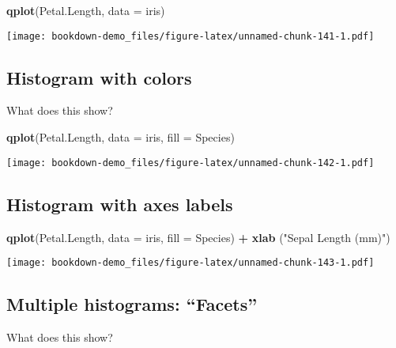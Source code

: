 \documentclass[]{book}
\newenvironment{Shaded}{\begin{snugshade}}{\end{snugshade}}
\newcommand{\KeywordTok}[1]{\textcolor[rgb]{0.13,0.29,0.53}{\textbf{#1}}}
\newcommand{\DataTypeTok}[1]{\textcolor[rgb]{0.13,0.29,0.53}{#1}}
\newcommand{\StringTok}[1]{\textcolor[rgb]{0.31,0.60,0.02}{#1}}
\newcommand{\OperatorTok}[1]{\textcolor[rgb]{0.81,0.36,0.00}{\textbf{#1}}}
\newcommand{\NormalTok}[1]{#1}
\theoremstyle{definition}
\theoremstyle{definition}
\theoremstyle{definition}
\theoremstyle{remark}
\begin{document}
\begin{Shaded}
\begin{Highlighting}[]
\KeywordTok{qplot}\NormalTok{(Petal.Length,}
      \DataTypeTok{data =}\NormalTok{ iris)}
\end{Highlighting}
\end{Shaded}

\texttt{[image: bookdown-demo\_files/figure-latex/unnamed-chunk-141-1.pdf]}

\subsection{Histogram with colors}\label{histogram-with-colors}

What does this show?

\begin{Shaded}
\begin{Highlighting}[]
\KeywordTok{qplot}\NormalTok{(Petal.Length,}
      \DataTypeTok{data =}\NormalTok{ iris,}
      \DataTypeTok{fill =}\NormalTok{ Species)}
\end{Highlighting}
\end{Shaded}

\texttt{[image: bookdown-demo\_files/figure-latex/unnamed-chunk-142-1.pdf]}

\subsection{Histogram with axes
labels}\label{histogram-with-axes-labels}

\begin{Shaded}
\begin{Highlighting}[]
\KeywordTok{qplot}\NormalTok{(Petal.Length,}
      \DataTypeTok{data =}\NormalTok{ iris,}
      \DataTypeTok{fill =}\NormalTok{ Species) }\OperatorTok{+}\StringTok{  }
\StringTok{  }\KeywordTok{xlab}\NormalTok{ (}\StringTok{"Sepal Length (mm)"}\NormalTok{)}
\end{Highlighting}
\end{Shaded}

\texttt{[image: bookdown-demo\_files/figure-latex/unnamed-chunk-143-1.pdf]}

\subsection{\texorpdfstring{Multiple histograms:
``Facets''}{Multiple histograms: Facets}}\label{multiple-histograms-facets}

What does this show?
\end{document}
